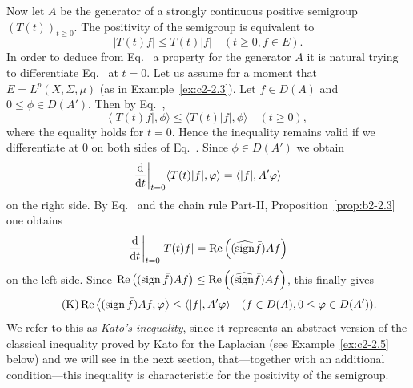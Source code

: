 Now let $A$ be the generator of a strongly continuous positive semigroup $(T(t))_{t \geq 0}$.
The positivity of the semigroup is equivalent to
\begin{equation}\label{eq:c2-2.7}
|T(t)f| \leq T(t)|f| \quad (t \geq 0  , f \in E).
\end{equation}
In order to deduce from Eq.~ a property for the generator $A$ it is natural trying to differentiate Eq.~ at $t = 0$.
Let us assume for a moment that $E = L^p(X,\Sigma,\mu)$ (as in Example~\ref{ex:c2-2.3}).
Let $f \in D(A)$ and $0 \leq \phi \in D(A')$.
Then by Eq.~,
\begin{equation}\label{eq:c2-2.8}
	\langle |T(t)f|,\phi \rangle \leq \langle T(t)|f|,\phi \rangle \quad (t \geq 0) ,
\end{equation}
where the equality holds for $t = 0$.
Hence the inequality remains valid if we differentiate at $0$ on both sides of Eq.~.
Since $\phi \in D(A')$ we obtain
\[
\frac{\diff{}}{\dt}\bigg|_{t=0} \langle T(t)|f|,\phi \rangle = \langle |f|,A'\phi \rangle
\]
on the right side.
By Eq.~ and the chain rule Part-II, Proposition~\ref{prop:b2-2.3} 
one obtains 
\[
{\frac{\mathop{}\!\mathrm{d}{}}{\mathop{}\!\mathrm{d}{t}}}\bigg|_{t=0} |T(t)f| = \mathop{}\!\mathrm{Re}\left((\widehat{\operatorname{sign}} \bar{f})Af\right)
\]
on the left side.
Since $\Re\left((\sign \bar{f})Af\right) \leq \Re\left((\widehat{\sign} \bar{f})Af\right)$, this finally gives
\begin{equation*}\label{eq:c2-K} \tag{K}
\Re\left\langle(\sign \bar{f})Af,\phi \right\rangle \leq \langle |f|,A'\phi \rangle \quad (f \in D(A)  , 0 \leq \phi \in D(A')).
\end{equation*}
We refer to this as \emph{Kato's inequality}, since it represents an abstract version of the classical inequality proved by Kato for the Laplacian (see Example~\ref{ex:c2-2.5} below) and we will see in the next section, that---together with an additional condition---this inequality is characteristic for the positivity of the semigroup.

